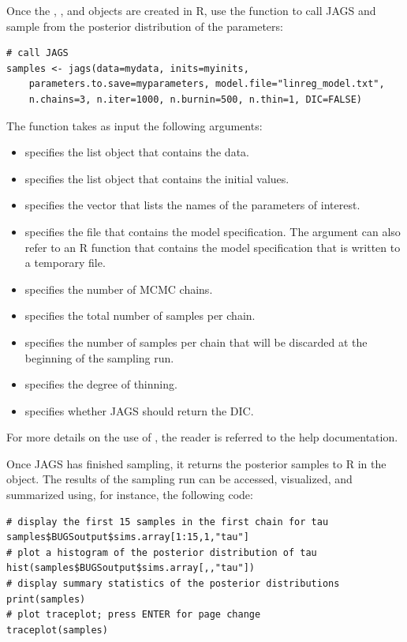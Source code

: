 \noindent Once the , , and  objects are created in R, use the  function to call JAGS and sample from the posterior distribution of the parameters:

\begin{lstlisting}
# call JAGS
samples <- jags(data=mydata, inits=myinits,
    parameters.to.save=myparameters, model.file="linreg_model.txt", 
    n.chains=3, n.iter=1000, n.burnin=500, n.thin=1, DIC=FALSE)
\end{lstlisting}

\noindent The  function takes as input the following arguments:
\begin{itemize}
\item {} specifies the list object that contains the data.
\item {} specifies the list object that contains the initial values.
\item {} specifies the vector that lists the names of the parameters of interest.
\item {} specifies the file that contains the model specification. The  argument can also refer to an R function that contains the model specification that is written to a temporary file.
\item {} specifies the number of MCMC chains.
\item {} specifies the total number of samples per chain.
\item {} specifies the number of samples per chain that will be discarded at the beginning of the sampling run.
\item {} specifies the degree of thinning.
\item {} specifies whether JAGS should return the DIC. 
\end{itemize}

\noindent For more details on the use of , the reader is referred to the help documentation. 

Once JAGS has finished sampling, it returns the posterior samples to R in the  object. The results of the sampling run can be accessed, visualized, and summarized using, for instance, the following code: 

\begin{lstlisting}
# display the first 15 samples in the first chain for tau
samples$BUGSoutput$sims.array[1:15,1,"tau"]
# plot a histogram of the posterior distribution of tau
hist(samples$BUGSoutput$sims.array[,,"tau"])
# display summary statistics of the posterior distributions
print(samples)
# plot traceplot; press ENTER for page change
traceplot(samples)
\end{lstlisting}


